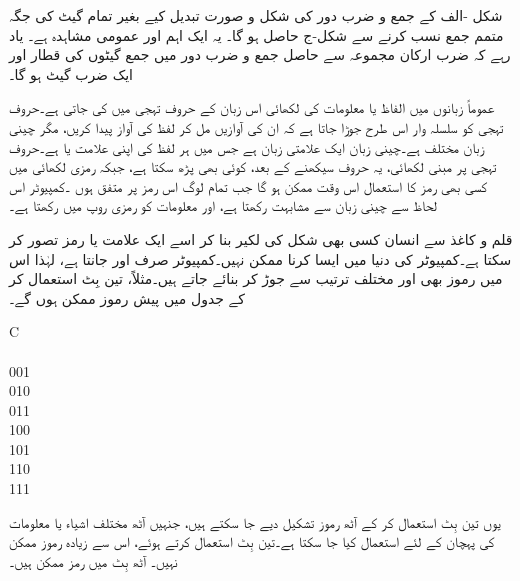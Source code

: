 شکل  -الف کے جمع و ضرب دور کی شکل و صورت تبدیل کیے بغیر تمام گیٹ کی جگہ  متمم جمع نسب  کرنے سے شکل-ج حاصل ہو گا۔ یہ ایک اہم اور عمومی  مشاہدہ ہے۔ یاد رہے کہ  ضرب ارکان مجموعہ سے حاصل    جمع و ضرب  دور میں   جمع   گیٹوں کی قطار اور ایک ضرب گیٹ ہو گا۔



عموماً زبانوں میں الفاظ یا معلومات کی لکھائی اس زبان کے حروف تہجی میں کی جاتی ہے۔حروف تہجی کو سلسلہ وار اس طرح جوڑا جاتا ہے کہ ان کی آوازیں مل کر  لفظ کی آواز پیدا کریں،  مگر چینی زبان  مختلف ہے۔چینی زبان ایک علامتی زبان ہے جس میں ہر لفظ کی اپنی علامت یا    ہے۔حروف تہجی پر مبنی لکھائی، یہ حروف  سیکھنے کے بعد،   کوئی بھی پڑھ سکتا ہے،  جبکہ  رمزی لکھائی میں کسی بھی رمز  کا استعمال اس وقت ممکن ہو گا  جب تمام لوگ اس رمز  پر متفق ہوں ۔کمپیوٹر اس لحاظ سے چینی زبان سے  مشابہت رکھتا ہے، اور   معلومات کو رمزی روپ   میں رکھتا  ہے۔ 

قلم و کاغذ  سے انسان کسی بھی شکل کی لکیر بنا کر اسے ایک علامت یا رمز   تصور کر سکتا ہے۔کمپیوٹر کی دنیا میں ایسا کرنا ممکن نہیں۔کمپیوٹر صرف   اور    جانتا ہے،  لہٰذا اس میں  رموز  بھی  اور   مختلف ترتیب سے جوڑ کر بنائے  جاتے ہیں۔مثلاً،  تین بِٹ  استعمال کر کے  جدول  میں پیش   رموز  ممکن ہوں گے۔
\begin{table}
\caption{تین   بِٹ رموز۔}
\label{جدول_بوولین_تین_بٹ_رموز}
\centering
\begin{otherlanguage}{english}
\begin{tabular}{C}
\toprule
{}\\
\\
001\\
010\\
011\\
100\\
101\\
110\\
111\\
\bottomrule
\end{tabular}
\end{otherlanguage}
\end{table}
یوں تین بِٹ استعمال کر کے  آٹھ  رموز   تشکیل دیے   جا سکتے ہیں،  جنہیں آٹھ مختلف اشیاء یا معلومات کی پہچان کے لئے استعمال کیا جا سکتا ہے۔تین بِٹ استعمال کرتے ہوئے،  اس سے زیادہ رموز   ممکن نہیں۔ آٹھ بِٹ  میں    رمز  ممکن  ہیں۔

